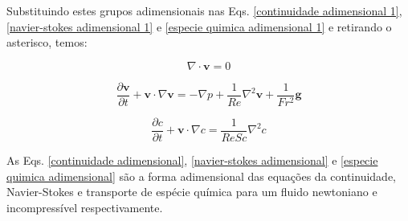 \medskip
Substituindo estes grupos adimensionais nas Eqs.
\ref{continuidade adimensional 1}, \ref{navier-stokes adimensional 1}
e \ref{especie quimica adimensional 1} e retirando o asterisco, temos:

\begin{equation} \label{continuidade adimensional}
 \nabla \cdot \textbf{v} = 0
\end{equation}

\begin{equation} \label{navier-stokes adimensional}
 \frac{\partial \textbf{v}}{\partial t} 
 + 
 \textbf{v} \cdot \nabla \textbf{v}
 =
 -
 \nabla p
 +
 \frac{1}{Re} \nabla^{2} \textbf{v}
 +
 \frac{1}{Fr^{2}} \textbf{g}
\end{equation}

\begin{equation} \label{especie quimica adimensional}
 \frac{\partial c}{\partial t}
 +
 \textbf{v} \cdot \nabla c
 =
 \frac{1}{ReSc} \nabla^{2} c
\end{equation}

\medskip
As Eqs.
\ref{continuidade adimensional}, 
\ref{navier-stokes adimensional} e 
\ref{especie quimica adimensional}
são a forma adimensional das equações
da continuidade, Navier-Stokes e
transporte de espécie química para um
fluido newtoniano e incompressível respectivamente.

